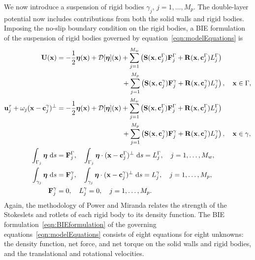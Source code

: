 \documentclass[AMA,STIX1COL]{WileyNJD-v2}
\begin{document}
We now introduce a suspension of rigid bodies $\gamma_j$,
$j=1,\ldots,M_p$.  The double-layer potential now includes contributions
from both the solid walls and rigid bodies.  Imposing the no-slip
boundary condition on the rigid bodies, a BIE formulation of the
suspension of rigid bodies governed by
equation~\eqref{eqn:modelEquations} is
\begin{subequations}
  \label{eqn:BIEformulation}
  \begin{align}
    {\mathbf{U}}({\mathbf{x}}) &= -\frac{1}{2}{\boldsymbol\eta}({\mathbf{x}}) + {\mathcal{D}}[{\boldsymbol\eta}]({\mathbf{x}}) +
    \sum_{j=1}^{M_w} \left(\mathbf{S}({\mathbf{x}},{\mathbf{c}}^\Gamma_j){\mathbf{F}}^\Gamma_j + 
      \mathbf{R}({\mathbf{x}},{\mathbf{c}}^\Gamma_j)L^\Gamma_j\right)  \nonumber \\
&\hspace{96pt}+\sum_{j=1}^{M_p} \left(\mathbf{S}({\mathbf{x}},{\mathbf{c}}^\gamma_j){\mathbf{F}}^\gamma_j +
\mathbf{R}({\mathbf{x}},{\mathbf{c}}^\gamma_j)L^\gamma_j\right),
    \quad {\mathbf{x}} \in \Gamma, \label{eqn:BIEformulation1} \\
  {\mathbf{u}}^\tau_j + \omega_j({\mathbf{x}} - {\mathbf{c}}_j^\gamma)^\perp &=
    -\frac{1}{2}{\boldsymbol\eta}({\mathbf{x}}) + {\mathcal{D}}[{\boldsymbol\eta}]({\mathbf{x}}) + 
    \sum_{j=1}^{M_w} \left(\mathbf{S}({\mathbf{x}},{\mathbf{c}}^\Gamma_j){\mathbf{F}}^\Gamma_j + 
      \mathbf{R}({\mathbf{x}},{\mathbf{c}}^\Gamma_j)L^\Gamma_j\right) \nonumber \\
&\hspace{96pt}+\sum_{j=1}^{M_p} \left(\mathbf{S}({\mathbf{x}},{\mathbf{c}}^\gamma_j){\mathbf{F}}^\gamma_j +
\mathbf{R}({\mathbf{x}},{\mathbf{c}}^\gamma_j)L^\gamma_j\right),
    \quad {\mathbf{x}} \in \gamma, \label{eqn:BIEformulation2} \\
  \int_{\Gamma_j} {\boldsymbol\eta}~\text{d}s &= {\mathbf{F}}^\Gamma_j, \quad
  \int_{\Gamma_j} {\boldsymbol\eta}\cdot ({\mathbf{x}} - {\mathbf{c}}^\Gamma_j)^\perp~\text{d}s =
  L^\Gamma_j, \quad j=1,\ldots,M_w, \label{eqn:BIEformulation3} \\
  \int_{\gamma_j} {\boldsymbol\eta}~\text{d}s &= {\mathbf{F}}^\gamma_j, \quad
  \int_{\gamma_j} {\boldsymbol\eta}\cdot ({\mathbf{x}} - {\mathbf{c}}^\gamma_j)^\perp~\text{d}s =
  L^\gamma_j,\quad j=1,\ldots,M_p, \label{eqn:BIEformulation4} \\
  {\mathbf{F}}^\gamma_j &= 0, \quad L^\gamma_j = 0,\quad j=1,\ldots,M_p.
  \label{eqn:BIEformulation5}
\end{align}
\end{subequations}
Again, the methodology of Power and Miranda relates the strength of the
Stokeslets and rotlets of each rigid body to its density function.  The
BIE formulation~\eqref{eqn:BIEformulation} of the governing
equations~\eqref{eqn:modelEquations} consists of eight equations for
eight unknowns: the density function, net force, and net torque on the
solid walls and rigid bodies, and the translational and rotational
velocities.
\end{document}
